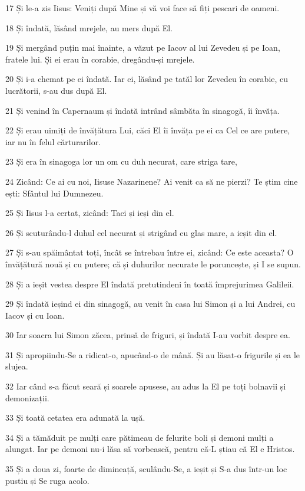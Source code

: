 \par 17 Și le-a zis Iisus: Veniți după Mine și vă voi face să fiți pescari de oameni.
\par 18 Și îndată, lăsând mrejele, au mers după El.
\par 19 Și mergând puțin mai înainte, a văzut pe Iacov al lui Zevedeu și pe Ioan, fratele lui. Și ei erau în corabie, dregându-și mrejele.
\par 20 Și i-a chemat pe ei îndată. Iar ei, lăsând pe tatăl lor Zevedeu în corabie, cu lucrătorii, s-au dus după El.
\par 21 Și venind în Capernaum și îndată intrând sâmbăta în sinagogă, îi învăța.
\par 22 Și erau uimiți de învățătura Lui, căci El îi învăța pe ei ca Cel ce are putere, iar nu în felul cărturarilor.
\par 23 Și era în sinagoga lor un om cu duh necurat, care striga tare,
\par 24 Zicând: Ce ai cu noi, Iisuse Nazarinene? Ai venit ca să ne pierzi? Te știm cine ești: Sfântul lui Dumnezeu.
\par 25 Și Iisus l-a certat, zicând: Taci și ieși din el.
\par 26 Și scuturându-l duhul cel necurat și strigând cu glas mare, a ieșit din el.
\par 27 Și s-au spăimântat toți, încât se întrebau între ei, zicând: Ce este aceasta? O învățătură nouă și cu putere; că și duhurilor necurate le poruncește, și I se supun.
\par 28 Și a ieșit vestea despre El îndată pretutindeni în toată împrejurimea Galileii.
\par 29 Și îndată ieșind ei din sinagogă, au venit în casa lui Simon și a lui Andrei, cu Iacov și cu Ioan.
\par 30 Iar soacra lui Simon zăcea, prinsă de friguri, și îndată I-au vorbit despre ea.
\par 31 Și apropiindu-Se a ridicat-o, apucând-o de mână. Și au lăsat-o frigurile și ea le slujea.
\par 32 Iar când s-a făcut seară și soarele apusese, au adus la El pe toți bolnavii și demonizații.
\par 33 Și toată cetatea era adunată la ușă.
\par 34 Și a tămăduit pe mulți care pătimeau de felurite boli și demoni mulți a alungat. Iar pe demoni nu-i lăsa să vorbească, pentru că-L știau că El e Hristos.
\par 35 Și a doua zi, foarte de dimineață, sculându-Se, a ieșit și S-a dus într-un loc pustiu și Se ruga acolo.
